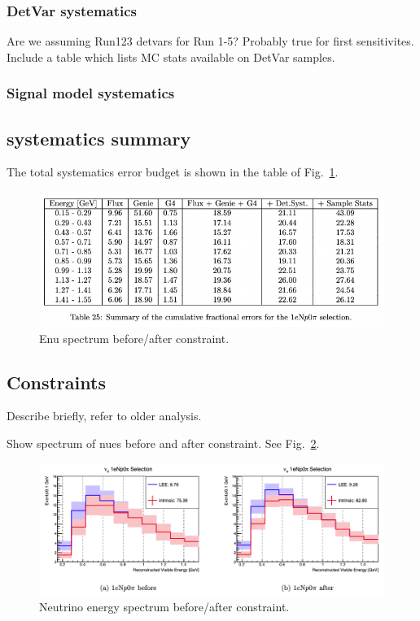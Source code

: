 \subsubsection{DetVar systematics} Are we assuming Run123 detvars for Run 1-5? Probably true for first sensitivites. \\
Include a table which lists MC stats available on DetVar samples.
\subsubsection{Signal model systematics}

\subsection{systematics summary}

The total systematics error budget is shown in the table of Fig.~\ref{fig:systematicsbudget}.

\begin{center}
\begin{figure}[h]
    \includegraphics[width=1.00\textwidth]{technote/SystematicsSensitivity/Figures/systematicsbudget.png}
    \caption{Enu spectrum before/after constraint.}
    \label{fig:systematicsbudget}
\end{figure}
\end{center}

\newpage
\subsection{Constraints}
Describe briefly, refer to older analysis.

Show spectrum of nues before and after constraint. See Fig.~\ref{fig:constraint}.

\begin{center}
\begin{figure}[h]
    \includegraphics[width=1.00\textwidth]{technote/SystematicsSensitivity/Figures/constraint.png}
    \caption{Neutrino energy spectrum before/after constraint.}
    \label{fig:constraint}
\end{figure}
\end{center}

